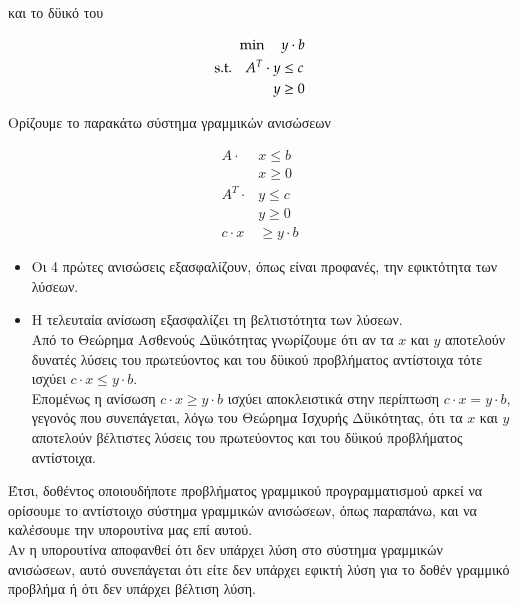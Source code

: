 \documentclass[12pt]{article}
\begin{document}
και το δϋικό του

\begin{align*}
    \min \quad y \cdot  b \\
    \begin{aligned}
   		\textup{s.t.}\quad
 		A^T \cdot  y & \leq c \\
		y & \geq 0
    \end{aligned}
\end{align*}

Ορίζουμε το παρακάτω σύστημα γραμμικών ανισώσεων

\begin{align*}
    A \cdot & x \leq b \\
    & x \geq 0 \\
    A^T \cdot & y \leq c \\
    & y \geq 0 \\
    c \cdot x & \geq y \cdot b
\end{align*}

\begin{itemize}
    \item Oι 4 πρώτες ανισώσεις εξασφαλίζουν, όπως είναι προφανές, την εφικτότητα των λύσεων.
    \item Η τελευταία ανίσωση εξασφαλίζει τη βελτιστότητα των λύσεων. \\

    Από το Θεώρημα Ασθενούς Δϋικότητας γνωρίζουμε ότι αν τα \( x \) και \( y \)
    αποτελούν δυνατές λύσεις του πρωτεύοντος και του δϋικού προβλήματος αντίστοιχα
    τότε ισχύει \( c \cdot x \leq y \cdot b \). \\

    Επομένως η ανίσωση \( c \cdot x \geq y \cdot b \) ισχύει αποκλειστικά στην περίπτωση
    \( c \cdot x = y \cdot b \), γεγονός που συνεπάγεται, λόγω
    του Θεώρημα Ισχυρής Δϋικότητας, ότι τα \( x \) και \( y \)
    αποτελούν βέλτιστες λύσεις του πρωτεύοντος και του δϋικού προβλήματος αντίστοιχα.
\end{itemize}

\pagebreak

Έτσι, δοθέντος οποιουδήποτε προβλήματος γραμμικού προγραμματισμού αρκεί να ορίσουμε το
αντίστοιχο σύστημα γραμμικών ανισώσεων, όπως παραπάνω, και να καλέσουμε την υπορουτίνα μας επί αυτού. \\

Αν η υπορουτίνα αποφανθεί ότι δεν υπάρχει λύση στο σύστημα γραμμικών ανισώσεων,
αυτό συνεπάγεται ότι είτε δεν υπάρχει εφικτή λύση για το δοθέν γραμμικό προβλήμα
ή ότι δεν υπάρχει βέλτιση λύση. \\
\end{document}

